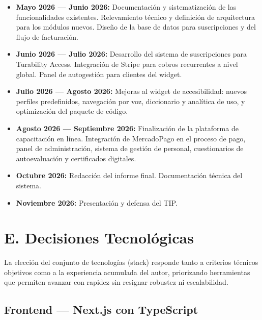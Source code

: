 \documentclass[12pt,a4paper]{article}
\begin{document}
\begin{itemize}[leftmargin=0pt, label={}]
  \item \textbf{Mayo 2026 — Junio 2026:} Documentación y sistematización de las funcionalidades
        existentes. Relevamiento técnico y definición de arquitectura para los módulos nuevos.
        Diseño de la base de datos para suscripciones y del flujo de facturación.

  \item \textbf{Junio 2026 — Julio 2026:} Desarrollo del sistema de suscripciones para Turability Access.
        Integración de Stripe para cobros recurrentes a nivel global. Panel de autogestión para clientes
        del widget.

  \item \textbf{Julio 2026 — Agosto 2026:} Mejoras al widget de accesibilidad: nuevos perfiles
        predefinidos, navegación por voz, diccionario y analítica de uso, y optimización del paquete de código.

  \item \textbf{Agosto 2026 — Septiembre 2026:} Finalización de la plataforma de capacitación en línea.
        Integración de MercadoPago en el proceso de pago, panel de administración, sistema de gestión de personal,
        cuestionarios de autoevaluación y certificados digitales.

  \item \textbf{Octubre 2026:} Redacción del informe final. Documentación técnica del sistema.

  \item \textbf{Noviembre 2026:} Presentación y defensa del TIP.
\end{itemize}

\section*{E. Decisiones Tecnológicas}

La elección del conjunto de tecnologías (stack) responde tanto a criterios técnicos objetivos como a la
experiencia acumulada del autor, priorizando herramientas que permiten avanzar con rapidez
sin resignar robustez ni escalabilidad.

\subsection*{Frontend — Next.js con TypeScript}
\end{document}
